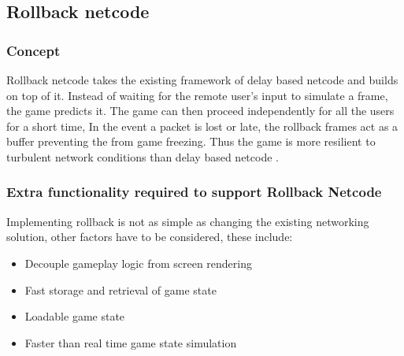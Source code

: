 \documentclass{entcs}
\begin{document}
\subsection{Rollback netcode}
\subsubsection{Concept}
Rollback netcode takes the existing framework of delay based netcode and builds on top of it. Instead of waiting for the remote user's input to simulate a frame, the game predicts it.  The game can then proceed independently for all the users for a short time, In the event a packet is lost or late, the rollback frames act as a buffer preventing the from game freezing. Thus the game is more resilient to turbulent network conditions than delay based netcode \cite{GGPODocumentation}. 

\subsubsection{Extra functionality required to support Rollback Netcode}
Implementing rollback is not as simple as changing the existing networking solution, other factors have to be considered, these include:
\begin{itemize}
\item Decouple gameplay logic from screen rendering
\item Fast storage and retrieval of game state
\item Loadable game state
\item Faster than real time game state simulation
\end{itemize}
\end{document}
